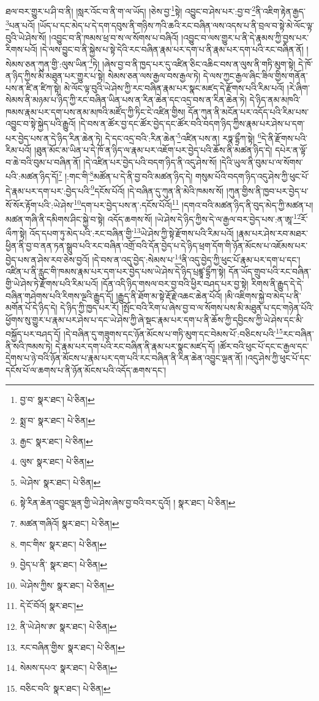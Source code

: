 ཐལ་བར་གྱུར་པ་ཤི་བ་ནི། །སླར་འོང་བ་ནི་ག་ལ་ཡོད། །ཅེས་བྱ་\footnote{བྱ་བ་  སྣར་ཐང་།  པེ་ཅིན། }སྟེ། འབྱུང་བ་ཤེས་པར་:བྱ་བ་\footnote{སྨྲ་བ་  སྣར་ཐང་།  པེ་ཅིན། }ནི་འཇིག་རྟེན་རྒྱད་\footnote{རྒྱང་  སྣར་ཐང་།  པེ་ཅིན། }པན་པའོ། །ཡོད་པ་དང་མེད་པ་དེ་དག་དབུས་ནི་གཉིས་ཀའི་ཆའི་རང་བཞིན་ལས་འདས་པ་ནི་བྲལ་བ་སྟེ་མེ་ལོང་ལྟ་བུའི་ཡེ་ཤེས་སོ། །འབྱུང་བ་ནི་ཁམས་ཕྲ་བ་ས་ལ་སོགས་པ་བཞིའོ། །འབྱུང་བ་ལས་གྱུར་པ་ནི་དེ་རྣམས་ཀྱི་བྱས་པར་རིགས་པའོ། །དེ་ལས་བྱུང་བ་ནི་སྐྱེས་པ་སྟེ་དེའི་རང་བཞིན་རྣམ་པར་དག་པ་ནི་རྣམ་པར་དག་པའི་རང་བཞིན་ནོ། །སེམས་ཅན་ཀུན་གྱི་:ལུས་ཡིན་\footnote{ལུས་  སྣར་ཐང་།  པེ་ཅིན། }ཏེ། །ཞེས་བྱ་བ་ནི་ཁྱད་པར་དུ་འཛིན་ཅིང་འཆིང་བས་ན་ལུས་ནི་གཏི་མུག་སྟེ། དེ་ཁོ་ན་ཉིད་ཀྱིས་མི་མཐུན་པར་གྱུར་པ་སྟེ། སེམས་ཅན་ལས་རྒྱལ་བས་རྒྱལ་ཏེ། དེ་ལས་ཀྱང་རྒྱལ་ཞིང་ཟིལ་གྱིས་གནོན་པས་ན་ཛི་ན་ཛིཀ་སྟེ། མེ་ལོང་ལྟ་བུའི་ཡེ་ཤེས་ཀྱི་རང་བཞིན་རྣམ་པར་སྣང་མཛད་དེ་རྫོགས་པའི་རིམ་པའོ། །རེ་ཞིག་སེམས་ནི་མཉམ་པ་ཉིད་ཀྱི་རང་བཞིན་ཡིན་པས་ན་རིན་ཆེན་དང་འདྲ་བས་ན་རིན་ཆེན་ཏེ། དེ་ཉིད་ནམ་མཁའི་ཁམས་རྣམ་པར་དག་པས་ནམ་མཁའི་མཛོད་ཀྱི་ཏིང་ངེ་འཛིན་གྱིས། དོན་ཀུན་ནི་མངོན་པར་འདོད་པའི་རིམ་པས་འབྱུང་བ་སྟེ་སྐྱེད་པའི་རྒྱུའོ། །དེ་བས་ན་ཚོར་བྱ་དང་ཚོར་བྱེད་དང་ཚོར་བའི་བདག་ཉིད་ཀྱིས་རྣམ་པར་ཤེས་པ་དག་པར་བྱེད་པས་ན་དེ་ཉིད་རིན་ཆེན་ཏེ། དེ་དང་འདྲ་བའི་:རིན་ཆེན་\footnote{ཡེ་ཤེས་  སྣར་ཐང་།  པེ་ཅིན། }འཛིན་པས་ན། རཏྣ་དྷྲྀཀ་སྟེ། \footnote{སྟེ་རིན་ཆེན་འབྱུང་ལྡན་གྱི་ཡེ་ཤེས་ཞེས་བྱ་བའི་བར་དུའོ། །   སྣར་ཐང་།  པེ་ཅིན། }དེ་ནི་རྫོགས་པའི་རིམ་པའོ། །ཐུན་མོང་མ་ཡིན་པ་དེ་ཁོ་ན་ཉིད་ལ་རྣམ་པར་འཇོག་པར་བྱེད་པའི་ཆོས་ནི་མཚན་ཉིད་དེ། དཔེར་ན་ལྟོ་བ་ཆེ་བའི་བུམ་པ་བཞིན་ནོ། །དེ་འཛིན་པར་བྱེད་པའི་བདག་ཉིད་ནི་འདུ་ཤེས་སོ། །དེའི་ཡུལ་ནི་བུམ་པ་ལ་སོགས་པའི་:མཚན་ཉིད་དོ།\footnote{མཚན་གཞིའོ།  སྣར་ཐང་།  པེ་ཅིན། } །:གང་གི་\footnote{གང་གིས་  སྣར་ཐང་།  པེ་ཅིན། }མཚོན་པ་དེ་ནི་བྱ་བའི་མཚན་ཉིད་དེ། གསུམ་པོའི་བདག་ཉིད་འདུ་ཤེས་ཀྱི་ཕུང་པོ་དེ་རྣམ་པར་དག་པར་:བྱེད་པའི་\footnote{བྱེད་པ་ནི་  སྣར་ཐང་།  པེ་ཅིན། }དངོས་པོའོ། །དེ་བཞིན་དུ་ཀུན་ནི་མེའི་ཁམས་སོ། །ཀུན་གྱིས་ནི་ཁྱབ་པར་བྱེད་པ་སོ་སོར་རྟོག་པའི་:ཡེ་ཤེས་\footnote{ཡེ་ཤེས་ཀྱིས་  སྣར་ཐང་།  པེ་ཅིན། }དག་པར་བྱེད་པས་ན་:དངོས་པོའོ།\footnote{དེ་ངོ་བོའོ།  སྣར་ཐང་། } །དགའ་བའི་མཚན་ཉིད་ནི་བུད་མེད་ཀྱི་མཚན་པ། མཚན་གཞི་ནི་དམིགས་ཤིང་སྐྱེ་བ་སྟེ། འདོད་ཆགས་སོ། །ཡེ་ཤེས་དེ་ཉིད་ཀྱིས་དེ་ལ་རྒྱལ་བར་བྱེད་པས་:ན་ཨཱ་\footnote{ནི་ཡེ་ཤེས་ཨ་  སྣར་ཐང་།  པེ་ཅིན། }རོ་ལྀཀ་སྟེ། འོད་དཔག་ཏུ་མེད་པའི་:རང་བཞིན་གྱི་\footnote{རང་བཞིན་གྱིས་  སྣར་ཐང་།  པེ་ཅིན། }ཡེ་ཤེས་ཀྱི་སྟེ་རྫོགས་པའི་རིམ་པའོ། །རྣམ་པར་ཤེས་རབ་མཐར་ཕྱིན་ནི་བྱ་བ་ནན་ཏན་སྒྲུབ་པའི་རང་བཞིན་འགྲོ་བའི་དོན་བྱེད་པ་དེ་ཉིད་ཕྲག་དོག་གི་ཉོན་མོངས་པ་འཇོམས་པར་བྱེད་པས་ན་ཤེས་རབ་ཅེས་བྱའོ། །དེ་བས་ན་འདུ་བྱེད་:སེམས་པ་\footnote{སེམས་དཔའ་  སྣར་ཐང་།  པེ་ཅིན། }ནི་འདུ་བྱེད་ཀྱི་ཕུང་པོ་རྣམ་པར་དག་པ་དང་། འཛིན་པ་ནི་རླུང་གི་ཁམས་རྣམ་པར་དག་པར་བྱེད་པས་ཡེ་ཤེས་དེ་ཉིད་པྲཛྙཱ་དྷྲྀཀ་སྟེ། དོན་ཡོད་གྲུབ་པའི་རང་བཞིན་གྱི་ཡེ་ཤེས་ཏེ་རྫོགས་པའི་རིམ་པའོ། །དོན་འདི་ཉིད་གསལ་བར་བྱ་བའི་ཕྱིར་བཤད་པར་བྱ་སྟེ། རིགས་ནི་རྒྱུད་དེ་དེ་བཞིན་གཤེགས་པའི་རིགས་ལྔའི་རྒྱུད་དོ། །རྒྱུད་ནི་ཐོག་མ་སྟེ་རྡོ་རྗེ་འཆང་ཆེན་པོའོ། །མི་འཇིགས་སྐྱེ་བ་མེད་པ་ནི་མགོན་པོ་དེ་ཉིད་དེ། དེ་ཉིད་ཀྱི་ཁྱད་པར་རོ། །སྤོང་བའི་རིག་པ་ཞེས་བྱ་བ་ལ་སོགས་པས་མི་མཐུན་པ་དང་གཉེན་པོའི་ཕྱོགས་སུ་གྱུར་པ་རྣམ་པར་ཤེས་པ་དང་ཡེ་ཤེས་ཀྱི་ཞེ་སྡང་རྣམ་པར་དག་པ་ནི་ཆོས་ཀྱི་དབྱིངས་ཀྱི་ཡེ་ཤེས་དང་མི་བསྐྱོད་པར་བཤད་དོ། །དེ་བཞིན་དུ་གཟུགས་དང་ཉོན་མོངས་པ་གཏི་མུག་དང་བེམས་པོ་:བཅིངས་པའི་\footnote{བཅིང་བའི་  སྣར་ཐང་།  པེ་ཅིན། }རང་བཞིན་ནི་སའི་ཁམས་ཏེ། དེ་རྣམ་པར་དག་པའི་རང་བཞིན་ནི་རྣམ་པར་སྣང་མཛད་དོ། །ཚོར་བའི་ཕུང་པོ་དང་ང་རྒྱལ་དང་དྲེགས་པ་ཉེ་བའི་ཉོན་མོངས་པ་རྣམ་པར་དག་པའི་རང་བཞིན་ནི་རིན་ཆེན་འབྱུང་ལྡན་ནོ། །འདུ་ཤེས་ཀྱི་ཕུང་པོ་དང་དངོས་པོ་ལ་ཆགས་པ་ནི་ཉོན་མོངས་པའི་འདོད་ཆགས་དང་། 
